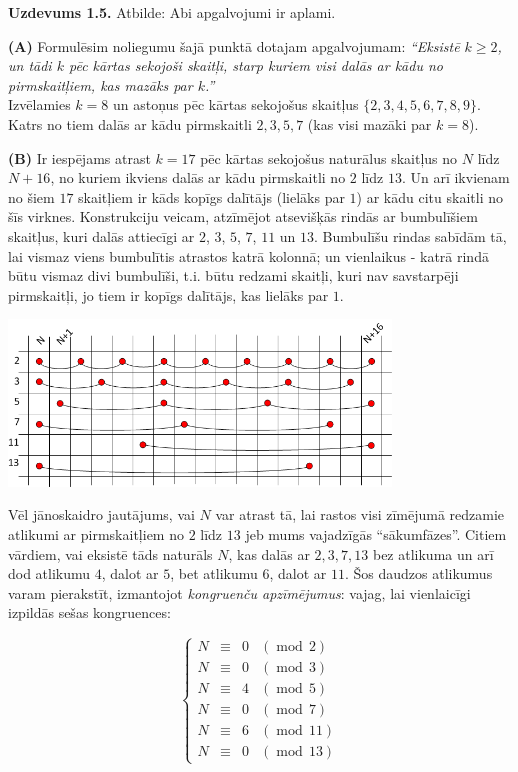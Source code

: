 \documentclass[a4paper,12pt]{article}
\begin{document}
\newpage
{\bf Uzdevums 1.5.} Atbilde: Abi apgalvojumi ir aplami.

\vspace{10pt}
{\bf (A)} Formulēsim noliegumu šajā punktā dotajam apgalvojumam:
{\em ``Eksistē $k \geq 2$, un tādi $k$ pēc kārtas sekojoši skaitļi, starp kuriem 
visi dalās ar kādu no pirmskaitļiem, kas mazāks par $k$.''}\\
Izvēlamies $k=8$ un astoņus pēc kārtas sekojošus skaitļus $\{ 2,3,4,5,6,7,8,9 \}$. 
Katrs no tiem dalās ar kādu pirmskaitli $2,3,5,7$ (kas visi mazāki par $k=8$). 

\vspace{10pt}
{\bf (B)} Ir iespējams atrast $k = 17$ pēc kārtas sekojošus
naturālus skaitļus no $N$ līdz $N+16$, no kuriem ikviens dalās ar kādu pirmskaitli no $2$ līdz $13$. Un arī ikvienam
no šiem $17$ skaitļiem ir kāds kopīgs dalītājs (lielāks par $1$) ar kādu citu skaitli no šīs virknes.
Konstrukciju veicam, atzīmējot atsevišķās rindās ar bumbulīšiem skaitļus, kuri dalās attiecīgi
ar $2$, $3$, $5$, $7$, $11$ un $13$. Bumbulīšu rindas sabīdām tā, lai
vismaz viens bumbulītis atrastos katrā kolonnā; un vienlaikus - katrā rindā būtu vismaz divi bumbulīši,
t.i. būtu redzami skaitļi, kuri nav savstarpēji pirmskaitļi, jo tiem ir kopīgs dalītājs, kas lielāks par $1$.

\includegraphics[width=4in]{bw2016-2.png}

Vēl jānoskaidro jautājums, vai $N$ var atrast tā, lai rastos visi zīmējumā redzamie atlikumi
ar pirmskaitļiem no $2$ līdz $13$ jeb mums vajadzīgās ``sākumfāzes''. Citiem vārdiem, vai eksistē tāds
naturāls $N$, kas dalās ar $2,3,7,13$ bez atlikuma un 
arī dod atlikumu $4$, dalot ar $5$, bet atlikumu $6$, dalot ar $11$. 
Šos daudzos atlikumus varam pierakstīt, izmantojot {\em kongruenču apzīmējumus}:
vajag, lai vienlaicīgi izpildās sešas kongruences:

\[
\left\{
\begin{array}{cccl}
N & \equiv & 0 & (\operatorname{mod}\,2) \\
N & \equiv & 0 & (\operatorname{mod}\,3) \\
N & \equiv & 4 & (\operatorname{mod}\,5) \\
N & \equiv & 0 & (\operatorname{mod}\,7) \\
N & \equiv & 6 & (\operatorname{mod}\,11) \\
N & \equiv & 0 & (\operatorname{mod}\,13)
\end{array}
\right.
\]
\end{document}
